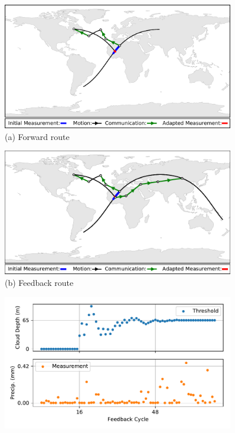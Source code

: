 \documentclass[conference]{IEEEtran}
\begin{document}
\begin{figure}[b!]
  \begin{minipage}[b]{\linewidth}
    \begin{center}
      \includegraphics[width=0.9\textwidth]{images/half_loop.png} \\
      {\footnotesize(a) Forward route}
    \end{center}
  \end{minipage}
  \begin{minipage}[b]{\linewidth}
    \begin{center}
      \includegraphics[width=0.9\textwidth]{images/loop.pdf} \\
      {\footnotesize(b) Feedback route}
    \end{center}
  \end{minipage}
  \begin{minipage}[b]{\linewidth}
    \begin{center}
      \includegraphics[width=0.9\textwidth]{images/regression.pdf} \\

\end{center}
\end{minipage}
\end{figure}
\end{document}
